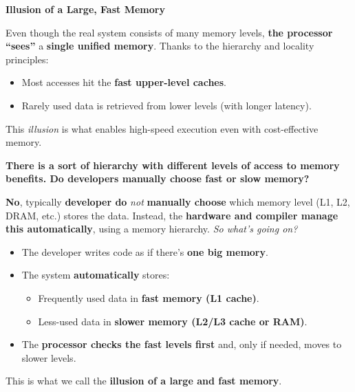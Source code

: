 \highspace
\begin{flushleft}
    \textcolor{Green3}{ \textbf{Illusion of a Large, Fast Memory}}
\end{flushleft}
Even though the real system consists of many memory levels, \textbf{the processor ``sees''} a \textbf{single unified memory}. Thanks to the hierarchy and locality principles:
\begin{itemize}
    \item Most accesses hit the \textbf{fast upper-level caches}.
    \item Rarely used data is retrieved from lower levels (with longer latency).
\end{itemize}
This \emph{illusion} is what enables high-speed execution even with cost-effective memory.

\highspace
\begin{flushleft}
    \textcolor{Green3}{ \textbf{There is a sort of hierarchy with different levels of access to memory benefits. Do developers manually choose fast or slow memory?}}
\end{flushleft}
\textbf{No}, typically \textbf{developer do} \emph{not} \textbf{manually choose} which memory level (L1, L2, DRAM, etc.) stores the data. Instead, the \textbf{hardware and compiler manage this automatically}, using a memory hierarchy. \emph{So what's going on?}
\begin{itemize}
    \item The developer writes code as if there's \textbf{one big memory}.
    \item The system \textbf{automatically} stores:
    \begin{itemize}
        \item Frequently used data in \textbf{fast memory (L1 cache)}.
        \item Less-used data in \textbf{slower memory (L2/L3 cache or RAM)}.
    \end{itemize}
    \item The \textbf{processor checks the fast levels first} and, only if needed, moves to slower levels.
\end{itemize}
This is what we call the \textbf{illusion of a large and fast memory}.

